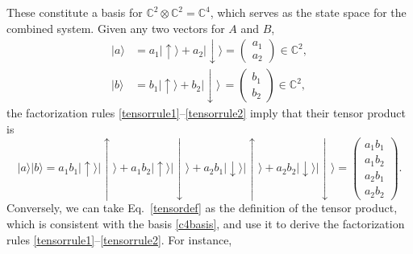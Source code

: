 \documentclass[prx,12pt]{revtex4-2}
\begin{document}
These constitute a basis for $\mathbb{C}^2 \otimes \mathbb{C}^2 =
\mathbb{C}^4$, which serves as the state space for the combined
system.  Given any two vectors for $A$ and $B$,
\begin{align}
  |a\rangle &=
  a_1 |\!\uparrow\rangle + a_2 |\!\downarrow\rangle =
  \begin{pmatrix} a_1 \\ a_2 \end{pmatrix} \in \mathbb{C}^2, \\
  |b\rangle &=
  b_1 |\!\uparrow\rangle + b_2 |\!\downarrow\rangle \,=
  \begin{pmatrix} b_1 \\ b_2 \end{pmatrix} \in \mathbb{C}^2,
\end{align}
the factorization rules \eqref{tensorrule1}--\eqref{tensorrule2} imply
that their tensor product is
\begin{equation}
  |a\rangle |b\rangle =
  a_1 b_1 |\!\uparrow\rangle |\!\uparrow\rangle
  + a_1 b_2 |\!\uparrow\rangle |\!\downarrow\rangle
  + a_2 b_1 |\!\downarrow\rangle |\!\uparrow\rangle
  + a_2 b_2 |\!\downarrow\rangle |\!\downarrow\rangle
  =
  \begin{pmatrix} a_1 b_1 \\ a_1 b_2 \\ a_2 b_1 \\ a_2 b_2 \end{pmatrix}.
  \label{tensordef}
\end{equation}
Conversely, we can take Eq.~\eqref{tensordef} as the definition of the
tensor product, which is consistent with the basis \eqref{c4basis},
and use it to derive the factorization rules
\eqref{tensorrule1}--\eqref{tensorrule2}.  For instance,
\end{document}

